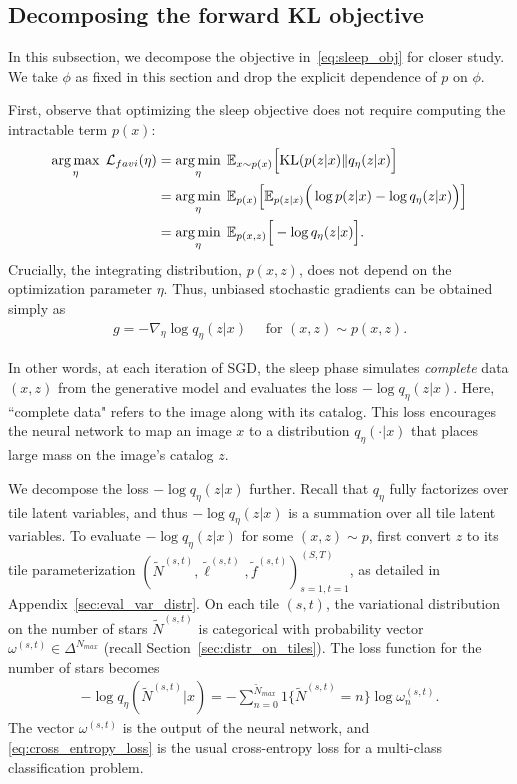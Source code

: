 \subsection{Decomposing the forward KL objective}
\label{sec:sleep_details}
In this subsection, we decompose the objective in~\eqref{eq:sleep_obj} for closer study.
We take $\phi$ as fixed in this section and drop the explicit dependence of $p$ on $\phi$.

First, observe that optimizing the sleep objective does not require computing the intractable term $p(x)$:
\begin{align}
\operatorname*{arg\,max}_\eta\; \mathcal{L}_{favi}(\eta)
    & = \operatorname*{arg\,min}_{\eta} \; \mathbb{E}_{x \sim p(x)}\Big[ \mathrm{KL}(p(z | x) \| q_\eta(z | x)\Big] \\
  &=\operatorname*{arg\,min}_{\eta} \; \mathbb E_{p(x)}\Big[\mathbb E_{p(z | x)}\Big(\log p(z | x) - \log q_\eta(z | x) \Big)\Big]\\
&=\operatorname*{arg\,min}_{\eta} \; \mathbb E_{p(x, z)}\Big[- \log q_\eta(z | x) \Big]\label{eq:sleep_loss_simple}.
\end{align}
Crucially, the integrating distribution, $p(x,z)$, does not depend on the optimization parameter $\eta$.
Thus, unbiased stochastic gradients can be obtained simply as
\begin{align}
    g = -\nabla_\eta \log q_\eta(z | x) \quad \text{ for } (x, z)\sim p(x, z).
\end{align}

In other words, at each iteration of SGD, the sleep phase simulates {\itshape complete} data $(x,z)$ from the generative model and evaluates the loss $-\log q_\eta(z | x)$.
Here, ``complete data" refers to the image along with its catalog.
This loss encourages the neural network to map an image $x$ to a distribution $q_{\eta}(\cdot | x)$ that places large mass on the image's catalog $z$.

We decompose the loss $-\log q_\eta(z | x)$ further.
Recall that $q_\eta$ fully factorizes over tile latent variables, and thus $-\log q_\eta(z | x)$ is a summation over all tile latent variables.
To evaluate $-\log q_\eta(z | x)$ for some $(x,z)\sim p$, first convert $z$ to its tile parameterization $(\tilde N^{(s,t)}, \tilde \ell^{(s,t)}, \tilde f^{(s,t)})_{s=1,t=1}^{(S,T)}$, as detailed in Appendix~\ref{sec:eval_var_distr}.
On each tile $(s,t)$, the variational distribution on the number of stars $\tilde N^{(s,t)}$ is categorical with probability vector $\omega^{(s,t)}\in\Delta^{N_{max}}$ (recall Section~\ref{sec:distr_on_tiles}).
The loss function for the number of stars becomes
\begin{align}
    - \log q_\eta(\tilde N^{(s,t)} | x) = -\sum_{n = 0}^{\tilde N_{max}} 1\{\tilde N^{(s,t)} = n\} \log \omega^{(s,t)}_n.
    \label{eq:cross_entropy_loss}
\end{align}
The vector $\omega^{(s,t)}$ is the output of the neural network, and \eqref{eq:cross_entropy_loss} is the usual cross-entropy loss for a multi-class classification problem.

